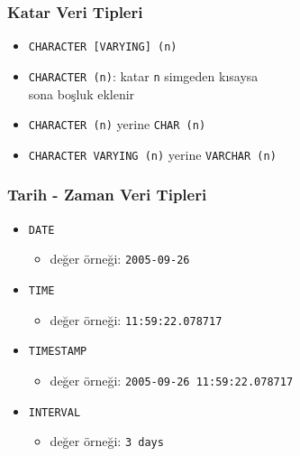 \documentclass[dvipsnames]{beamer}
\theoremstyle{plain}
\begin{document}
\begin{frame}
  \frametitle{Katar Veri Tipleri}

  \begin{itemize}
    \item \texttt{CHARACTER [VARYING] (n)}
    \item \texttt{CHARACTER (n)}: katar \texttt{n} simgeden kısaysa\\
        sona boşluk eklenir

    \medskip
    \item \texttt{CHARACTER (n)} yerine \texttt{CHAR (n)}
    \item \texttt{CHARACTER VARYING (n)} yerine \texttt{VARCHAR (n)}
  \end{itemize}
\end{frame}

\begin{frame}
  \frametitle{Tarih - Zaman Veri Tipleri}

  \begin{itemize}
    \item \texttt{DATE}
    \begin{itemize}
      \item değer örneği: \texttt{2005-09-26}
    \end{itemize}

    \medskip
    \item \texttt{TIME}
    \begin{itemize}
      \item değer örneği: \texttt{11:59:22.078717}
    \end{itemize}

    \medskip
    \item \texttt{TIMESTAMP}
    \begin{itemize}
      \item değer örneği: \texttt{2005-09-26 11:59:22.078717}
    \end{itemize}

    \medskip
    \item \texttt{INTERVAL}
    \begin{itemize}
      \item değer örneği: \texttt{3 days}
    \end{itemize}
  \end{itemize}
\end{frame}
\end{document}

